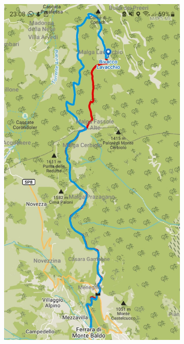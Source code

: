 \documentclass{article}
\begin{document}
\begin{figure}[htbp!]
    \centering
    \begin{subfigure}[t]{0.45\textwidth}
        \centering
        \vspace{0pt} %
        \includegraphics[width=\textwidth]{images/sentiero_mapsMe.jpg}

\end{subfigure}
\end{figure}
\end{document}
